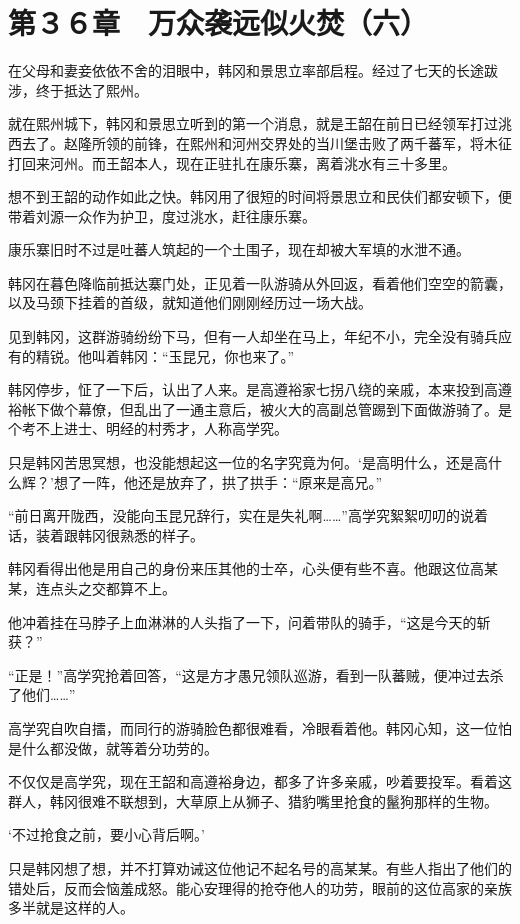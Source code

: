 \section{第３６章　万众袭远似火焚（六）}

在父母和妻妾依依不舍的泪眼中，韩冈和景思立率部启程。经过了七天的长途跋涉，终于抵达了熙州。

就在熙州城下，韩冈和景思立听到的第一个消息，就是王韶在前日已经领军打过洮西去了。赵隆所领的前锋，在熙州和河州交界处的当川堡击败了两千蕃军，将木征打回来河州。而王韶本人，现在正驻扎在康乐寨，离着洮水有三十多里。

想不到王韶的动作如此之快。韩冈用了很短的时间将景思立和民伕们都安顿下，便带着刘源一众作为护卫，度过洮水，赶往康乐寨。

康乐寨旧时不过是吐蕃人筑起的一个土围子，现在却被大军填的水泄不通。

韩冈在暮色降临前抵达寨门处，正见着一队游骑从外回返，看着他们空空的箭囊，以及马颈下挂着的首级，就知道他们刚刚经历过一场大战。

见到韩冈，这群游骑纷纷下马，但有一人却坐在马上，年纪不小，完全没有骑兵应有的精锐。他叫着韩冈：“玉昆兄，你也来了。”

韩冈停步，怔了一下后，认出了人来。是高遵裕家七拐八绕的亲戚，本来投到高遵裕帐下做个幕僚，但乱出了一通主意后，被火大的高副总管踢到下面做游骑了。是个考不上进士、明经的村秀才，人称高学究。

只是韩冈苦思冥想，也没能想起这一位的名字究竟为何。‘是高明什么，还是高什么辉？’想了一阵，他还是放弃了，拱了拱手：“原来是高兄。”

“前日离开陇西，没能向玉昆兄辞行，实在是失礼啊……”高学究絮絮叨叨的说着话，装着跟韩冈很熟悉的样子。

韩冈看得出他是用自己的身份来压其他的士卒，心头便有些不喜。他跟这位高某某，连点头之交都算不上。

他冲着挂在马脖子上血淋淋的人头指了一下，问着带队的骑手，“这是今天的斩获？”

“正是！”高学究抢着回答，“这是方才愚兄领队巡游，看到一队蕃贼，便冲过去杀了他们……”

高学究自吹自擂，而同行的游骑脸色都很难看，冷眼看着他。韩冈心知，这一位怕是什么都没做，就等着分功劳的。

不仅仅是高学究，现在王韶和高遵裕身边，都多了许多亲戚，吵着要投军。看着这群人，韩冈很难不联想到，大草原上从狮子、猎豹嘴里抢食的鬣狗那样的生物。

‘不过抢食之前，要小心背后啊。’

只是韩冈想了想，并不打算劝诫这位他记不起名号的高某某。有些人指出了他们的错处后，反而会恼羞成怒。能心安理得的抢夺他人的功劳，眼前的这位高家的亲族多半就是这样的人。

